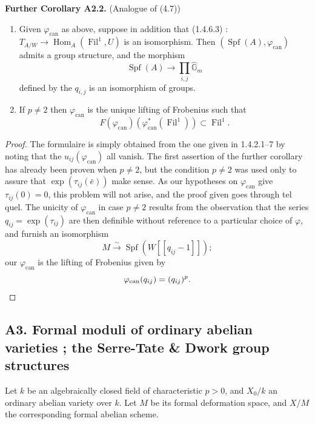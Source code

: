 \documentclass[12pt,a4paper]{article}
\theoremstyle{plain}
\theoremstyle{definition}
\theoremstyle{remark}
\DeclareMathOperator{\Fil}{Fil}
\DeclareMathOperator{\Hom}{Hom}
\DeclareMathOperator{\Spf}{Spf}
\providecommand{\Hom}{\operatorname{Hom}}
\begin{document}
\textbf{Further Corollary A2.2.} (Analogue of (4.7))
\begin{enumerate}[label=(\arabic*)]
\item Given $\varphi_{\mathrm{can}}$ as above, suppose in addition that (1.4.6.3) : $T_{A/W} \to \Hom_A(\Fil^1, U)$ is an isomorphism. Then $(\Spf(A), \varphi_{\mathrm{can}})$ admits a group structure, and the morphism
\[
\Spf(A) \longrightarrow \prod_{i,j} \hat{\mathbb{G}}_m
\]
defined by the $q_{i,j}$ is an isomorphism of groups.
\item If $p \neq 2$ then $\varphi_{\mathrm{can}}$ is the unique lifting of Frobenius such that
\[
F(\varphi_{\mathrm{can}})(\varphi_{\mathrm{can}}^*(\Fil^1)) \subset \Fil^1.
\]
\end{enumerate}

\begin{proof}
The formulaire is simply obtained from the one given in 1.4.2.1--7 by noting that the $u_{ij}(\varphi_{\mathrm{can}})$ all vanish. The first assertion of the further corollary has already been proven when $p \neq 2$, but the condition $p \neq 2$ was used only to assure that $\exp(\tau_{ij}(\bar{e}))$ make sense. As our hypotheses on $\varphi_{\mathrm{can}}$ give $\tau_{ij}(0) = 0$, this problem will not arise, and the proof given goes through tel quel. The unicity of $\varphi_{\mathrm{can}}$ in case $p \neq 2$ results from the observation that the series $q_{ij} = \exp(\tau_{ij})$ are then definible without reference to a particular choice of $\varphi$, and furnish an isomorphism
\[
M \xrightarrow{\sim} \Spf(W[[q_{ij} - 1]]);
\]
our $\varphi_{\mathrm{can}}$ is the lifting of Frobenius given by
\[
\varphi_{\mathrm{can}}(q_{ij}) = (q_{ij})^p. \qedhere
\]
\end{proof}

\subsection*{A3. Formal moduli of ordinary abelian varieties ; the Serre-Tate \& Dwork group structures}

Let $k$ be an algebraically closed field of characteristic $p > 0$, and $X_0/k$ an ordinary abelian variety over $k$. Let $M$ be its formal deformation space, and $X/M$ the corresponding formal abelian scheme.
\end{document}
